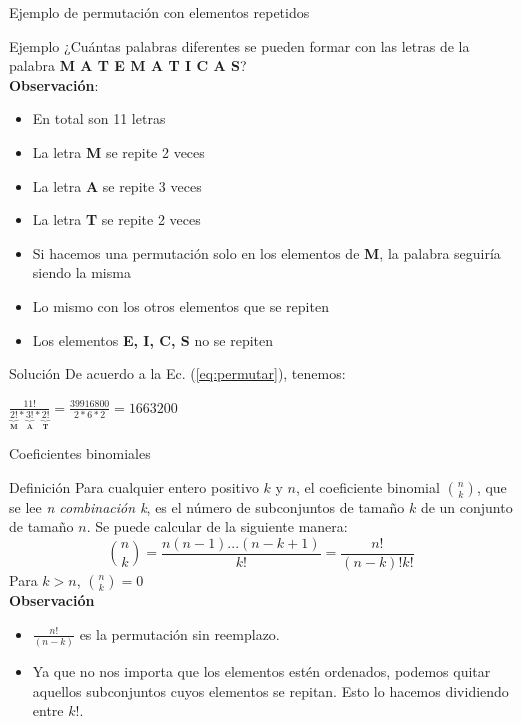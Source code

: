 \documentclass{beamer}
\begin{document}
\begin{frame}{Ejemplo de permutaci\'on con elementos repetidos}
  \begin{exampleblock}{Ejemplo}
    ¿Cu\'antas palabras diferentes se pueden formar con las letras de la palabra
    \textbf{M A T E M A T I C A S}?\\
    \textbf{Observaci\'on}:
    \begin{itemize}
      \item En total son 11 letras
       \item La letra \textbf{M} se repite 2 veces
       \item La letra \textbf{A} se repite 3 veces
       \item La letra \textbf{T} se repite 2 veces
       \item Si hacemos una permutaci\'on solo en los elementos de \textbf{M}, la palabra
      seguir\'ia siendo la misma
       \item Lo mismo con los otros elementos que se repiten
       \item Los elementos \textbf{E, I, C, S} no se repiten
    \end{itemize}
  \end{exampleblock}

\end{frame}

\begin{frame}{Soluci\'on}
  De acuerdo a la Ec. (\ref{eq:permutar}), tenemos:
  \begin{exampleblock}{}
    \centering
$\frac{11!}{\underbrace{2!}_{\textbf{M}}*\underbrace{3!}_{\textbf{A}}*\underbrace{2!}_{\textbf{T}}}
    = \frac{39916800}{2*6*2}=1663200$
  \end{exampleblock}
\end{frame}

\begin{frame}{Coeficientes binomiales}
  \begin{block}{Definici\'on}
    Para cualquier entero positivo $k$ y $n$, el coeficiente binomial
    $\binom{n}{k}$, que se lee \textit{n combinaci\'on k}, es el n\'umero de
    subconjuntos de tamaño $k$ de un conjunto de tamaño $n$. Se puede calcular de la
    siguiente manera:
  \begin{equation}
    \binom{n}{k} = \frac{n(n-1)...(n-k+1)}{k!} = \frac{n!}{(n-k)!k!}
    \label{eq:binomial}
  \end{equation}
  Para $k>n$, $\binom{n}{k}=0$ \\
  \textbf{Observaci\'on}\\
  \begin{itemize}
    \item $\frac{n!}{(n-k)}$ es la permutaci\'on sin reemplazo.
     \item Ya que no nos importa que los elementos est\'en ordenados,
    podemos quitar aquellos subconjuntos cuyos elementos se repitan. Esto lo hacemos
    dividiendo entre $k!$.
  \end{itemize}
\end{block}
\end{frame}
\end{document}
